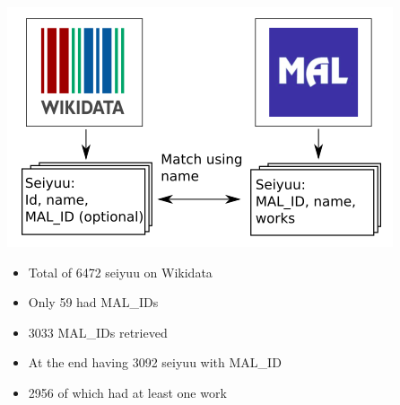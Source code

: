 \begin{frame}
\begin{center}
\includegraphics[scale=0.7]{graphics/wikidataMAL.png} 
\end{center}

\begin{itemize}
\item Total of 6472 seiyuu on Wikidata
\item Only 59 had MAL\_IDs
\item 3033 MAL\_IDs retrieved
\item At the end having 3092 seiyuu with MAL\_ID
\item 2956 of which had at least one work

\end{itemize}
\end{frame}

